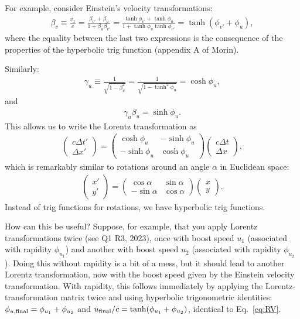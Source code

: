 \documentclass[12pt]{article}
\newcommand{\be}{\begin{eqnarray}}
\newcommand{\ee}{\end{eqnarray}}
\begin{document}
For example, consider Einstein’s velocity transformations:
\be
\beta_v\equiv\frac{v_x}{c}=\frac{\beta_{v'}+\beta_u}{1+\beta_u\beta_{v'}}=\frac{\tanh\phi_{v'}+\tanh\phi_u}{1+\tanh\phi_u\tanh\phi_{v'}}=\tanh(\phi_{v'}+\phi_u), \label{eq:RV}
\ee
where the equality between the last two expressions is the consequence of the properties of the hyperbolic trig function (appendix A of Morin).

Similarly:
\be
\gamma_u \equiv \frac{1}{\sqrt{1-\beta_u^2}} = \frac{1}{\sqrt{1-\tanh^2 \phi_u}} = \cosh \phi_u,
\ee
and
\be
\gamma_u \beta_u = \sinh \phi_u.
\ee
This allows us to write the Lorentz transformation as
\be
\begin{pmatrix}
c\Delta t' \\
\Delta x'
\end{pmatrix} =
\begin{pmatrix}
\cosh \phi_u & -\sinh \phi_u \\
-\sinh \phi_u  & \cosh \phi_u
\end{pmatrix}\begin{pmatrix}
c\Delta t \\
\Delta x
\end{pmatrix},
\ee
which is remarkably similar to rotations around an angle $\alpha$ in Euclidean space:
\be
\begin{pmatrix}
x' \\
y'
\end{pmatrix} =
\begin{pmatrix}
\cos \alpha &  \sin \alpha \\
-\sin \alpha & \cos \alpha
\end{pmatrix}
\begin{pmatrix}
x \\
y
\end{pmatrix}.
\ee
Instead of trig functions for rotations, we have hyperbolic trig functions.

How can this be useful? Suppose, for example, that you apply Lorentz transformations twice (see Q1 R3, 2023), once with boost speed $u_1$ (associated with rapidity $\phi_{u_1}$) and another with boost speed $u_2$ (associated with rapidity $\phi_{u_2}$). Doing this without rapidity is a bit of a mess, but it should lead to another Lorentz transformation, now with the boost speed given by the Einstein velocity transformation. With rapidity, this follows immediately by applying the Lorentz-transformation matrix twice and using hyperbolic trigonometric identities: $\phi_{u,\rm final}=\phi_{u_1}+\phi_{u_2}$ and $u_{\rm final}/c=\tanh(\phi_{u_1}+\phi_{u_2})$, identical to Eq.~\eqref{eq:RV}.
\end{document}
